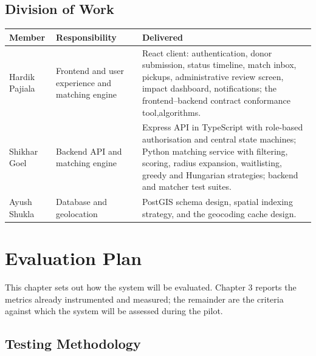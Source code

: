 \documentclass[12pt,a4paper]{report}
\begin{document}
\section{Division of Work}

\begin{longtable}{@{}p{3cm}p{3cm}p{7.5cm}@{}}
\toprule
\textbf{Member} & \textbf{Responsibility} & \textbf{Delivered} \\
\midrule
\endhead
Hardik Pajiala \newline 1024030119 & Frontend and user experience and matching engine & React client: authentication, donor submission, status timeline, match inbox, pickups, administrative review screen, impact dashboard, notifications; the frontend--backend contract conformance tool,algorithms. \\
Shikhar Goel \newline 1024030916 & Backend API and matching engine & Express API in TypeScript with role-based authorisation and central state machines; Python matching service with filtering, scoring, radius expansion, waitlisting, greedy and Hungarian strategies; backend and matcher test suites. \\
Ayush Shukla \newline 1024030164 & Database and geolocation & PostGIS schema design, spatial indexing strategy, and the geocoding cache design. \\
\bottomrule
\end{longtable}

\chapter{Evaluation Plan}

This chapter sets out how the system will be evaluated. Chapter 3 reports the metrics already instrumented and measured; the remainder are the criteria against which the system will be assessed during the pilot.

\section{Testing Methodology}
\end{document}
